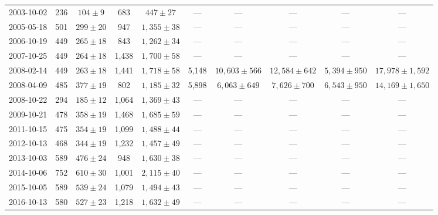 \begin{landscape}
\begin{longtable}{cccccccccc}
{2003-10-02} & 236 & {$104  \pm  9$} & 683 & {$447 \pm 27$} & --- & --- & --- & --- & --- \\
{2005-05-18} & 501 & {$299  \pm  20$} & 947 & {$1,355 \pm 38$} & --- & --- & --- & --- & --- \\
{2006-10-19} & 449 & {$265  \pm  18$} & 843 & {$1,262 \pm 34$} & --- & --- & --- & --- & --- \\
{2007-10-25} & 449 & {$264  \pm  18$} & 1,438 & {$1,700 \pm 58$} & --- & --- & --- & --- & --- \\
{2008-02-14} & 449 & {$263  \pm  18$} & 1,441 & {$1,718 \pm 58$} & 5,148 & {$10,603 \pm 566$} & {$12,584 \pm 642$} & {$5,394 \pm 950$} & {$17,978 \pm 1,592$} \\
{2008-04-09} & 485 & {$377  \pm  19$} & 802 & {$1,185 \pm 32$} & 5,898 & {$6,063 \pm 649$} & {$7,626 \pm 700$} & {$6,543 \pm 950$} & {$14,169 \pm 1,650$} \\
{2008-10-22} & 294 & {$185  \pm  12$} & 1,064 & {$1,369 \pm 43$} & --- & --- & --- & --- & --- \\
{2009-10-21} & 478 & {$358  \pm  19$} & 1,468 & {$1,685 \pm 59$} & --- & --- & --- & --- & --- \\
{2011-10-15} & 475 & {$354  \pm  19$} & 1,099 & {$1,488 \pm 44$} & --- & --- & --- & --- & --- \\
{2012-10-13} & 468 & {$344  \pm  19$} & 1,232 & {$1,457 \pm 49$} & --- & --- & --- & --- & --- \\
{2013-10-03} & 589 & {$476  \pm  24$} & 948 & {$1,630 \pm 38$} & --- & --- & --- & --- & --- \\
{2014-10-06} & 752 & {$610  \pm  30$} & 1,001 & {$2,115 \pm 40$} & --- & --- & --- & --- & --- \\
{2015-10-05} & 589 & {$539  \pm  24$} & 1,079 & {$1,494 \pm 43$} & --- & --- & --- & --- & --- \\
{2016-10-13} & 580 & {$527  \pm  23$} & 1,218 & {$1,632 \pm 49$} & --- & --- & --- & --- & --- \\
\end{longtable} 
\end{landscape} 
